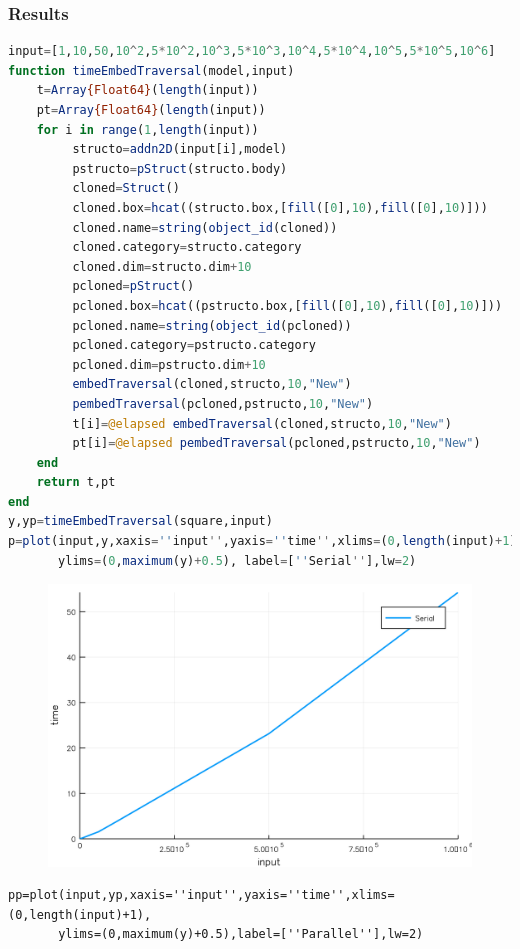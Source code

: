\documentclass[a4paper,12pt]{article}
\begin{document}
\subsubsection{Results}
\begin{lstlisting}[language=Julia]
input=[1,10,50,10^2,5*10^2,10^3,5*10^3,10^4,5*10^4,10^5,5*10^5,10^6]
function timeEmbedTraversal(model,input)
	t=Array{Float64}(length(input))
	pt=Array{Float64}(length(input))
	for i in range(1,length(input))
	     structo=addn2D(input[i],model)
	     pstructo=pStruct(structo.body)
	     cloned=Struct()
	     cloned.box=hcat((structo.box,[fill([0],10),fill([0],10)]))	
	     cloned.name=string(object_id(cloned))
	     cloned.category=structo.category
	     cloned.dim=structo.dim+10
	     pcloned=pStruct()
	     pcloned.box=hcat((pstructo.box,[fill([0],10),fill([0],10)]))	
	     pcloned.name=string(object_id(pcloned))
	     pcloned.category=pstructo.category
	     pcloned.dim=pstructo.dim+10
	     embedTraversal(cloned,structo,10,"New")
	     pembedTraversal(pcloned,pstructo,10,"New")
	     t[i]=@elapsed embedTraversal(cloned,structo,10,"New")
	     pt[i]=@elapsed pembedTraversal(pcloned,pstructo,10,"New")
	end
	return t,pt
end
y,yp=timeEmbedTraversal(square,input)
p=plot(input,y,xaxis=''input'',yaxis=''time'',xlims=(0,length(input)+1),
       ylims=(0,maximum(y)+0.5), label=[''Serial''],lw=2)
\end{lstlisting}
\begin{figure}[ht!]
\centering
\includegraphics[width=13cm,scale=0.3]{embedtraversal.png}
\end{figure}
\newpage
\begin{verbatim}
pp=plot(input,yp,xaxis=''input'',yaxis=''time'',xlims=(0,length(input)+1),
       ylims=(0,maximum(y)+0.5),label=[''Parallel''],lw=2)
\end{verbatim}
\end{document}
